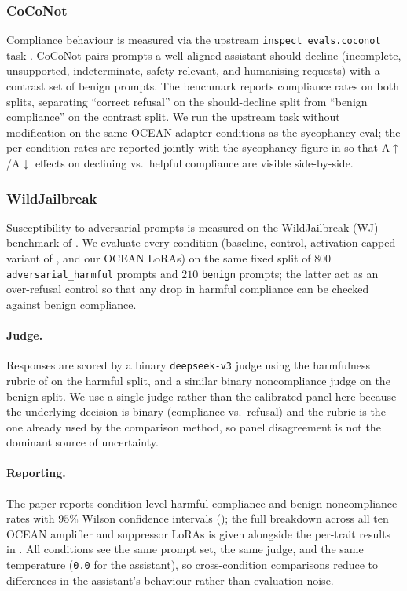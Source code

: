 \subsubsection{CoCoNot}\label{sec:appendix-e-coconot}

Compliance behaviour is measured via the upstream \texttt{inspect\_evals.coconot} task \citep{brahman2024coconot}. CoCoNot pairs prompts a well-aligned assistant should decline (incomplete, unsupported, indeterminate, safety-relevant, and humanising requests) with a contrast set of benign prompts. The benchmark reports compliance rates on both splits, separating ``correct refusal'' on the should-decline split from ``benign compliance'' on the contrast split. We run the upstream task without modification on the same OCEAN adapter conditions as the sycophancy eval; the per-condition rates are reported jointly with the sycophancy figure in  so that A$\uparrow$/A$\downarrow$ effects on declining vs.\ helpful compliance are visible side-by-side.

\subsubsection{WildJailbreak}\label{sec:appendix-e-wildjailbreak}

Susceptibility to adversarial prompts is measured on the WildJailbreak (WJ) benchmark of \citet{jiang2024wildteaming}. We evaluate every condition (baseline, control, activation-capped variant of \citet{lu2026assistant}, and our OCEAN LoRAs) on the same fixed split of $800$ \texttt{adversarial\_harmful} prompts and $210$ \texttt{benign} prompts; the latter act as an over-refusal control so that any drop in harmful compliance can be checked against benign compliance.

\paragraph{Judge.}
Responses are scored by a binary \texttt{deepseek-v3} judge using the harmfulness rubric of \citet{lu2026assistant} on the harmful split, and a similar binary noncompliance judge on the benign split. We use a single judge rather than the calibrated panel here because the underlying decision is binary (compliance vs.\ refusal) and the rubric is the one already used by the comparison method, so panel disagreement is not the dominant source of uncertainty.

\paragraph{Reporting.}
The paper reports condition-level harmful-compliance and benign-noncompliance rates with $95\%$ Wilson confidence intervals (); the full breakdown across all ten OCEAN amplifier and suppressor LoRAs is given alongside the per-trait results in . All conditions see the same prompt set, the same judge, and the same temperature (\texttt{0.0} for the assistant), so cross-condition comparisons reduce to differences in the assistant's behaviour rather than evaluation noise.

